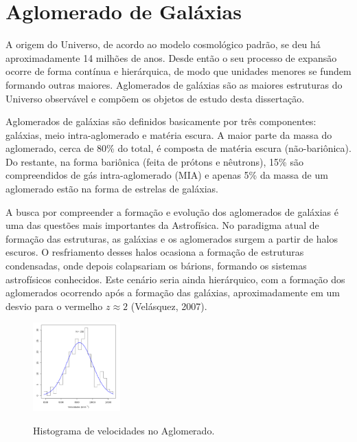 
\chapter{Aglomerado de Galáxias}
A origem do Universo, de acordo ao modelo cosmológico padrão, se deu há aproximadamente 14 milhões de anos. Desde então o seu processo de expansão ocorre de forma contínua e hierárquica, de modo que unidades menores se fundem formando outras maiores. Aglomerados de galáxias são as maiores estruturas do Universo observável e compõem os objetos de estudo desta dissertação.  

Aglomerados de galáxias são definidos basicamente por três componentes: galáxias, meio intra-aglomerado e matéria escura. A maior parte da massa do aglomerado, cerca de 80\% do total, é composta de matéria escura (não-bariônica). Do restante, na forma bariônica (feita de prótons e nêutrons), 15\% são compreendidos de gás intra-aglomerado (MIA) e apenas 5\% da massa de um aglomerado estão na forma de estrelas de galáxias.

A busca por compreender a formação e evolução dos aglomerados de galáxias é uma das questões mais importantes da Astrofísica. No paradigma atual de formação das estruturas, as galáxias e os aglomerados surgem a partir de halos escuros. O resfriamento desses halos ocasiona a formação de estruturas condensadas, onde depois colapsariam os bárions, formando  os sistemas astrofísicos conhecidos. Este cenário seria ainda hierárquico, com a formação dos aglomerados ocorrendo após a formação das galáxias, aproximadamente em um desvio para o vermelho $z \approx 2$ (Velásquez, 2007).

\begin{figure}[!htb]
	\centering
	\caption{Histograma de velocidades no Aglomerado.}
	\includegraphics[width=0.3\textwidth]{04-figuras/distVel}
	\label{fig1}
\end{figure}

